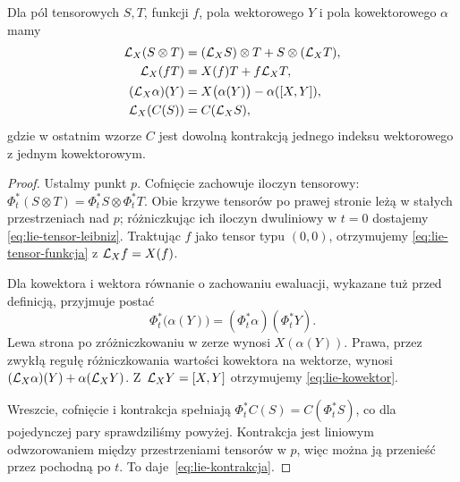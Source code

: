 \begin{twierdzenie}
\label{thm:lie-tensor-reguly}
Dla pól tensorowych $S,T$, funkcji $f$, pola wektorowego
$Y$ i pola kowektorowego $\alpha$ mamy
\begin{align}
 \mathcal L_X(S\otimes T)
 &= (\mathcal L_XS)\otimes T+S\otimes(\mathcal L_XT),
 \label{eq:lie-tensor-leibniz}\\
 \mathcal L_X(fT)&=X(f)T+f\mathcal L_XT,
 \label{eq:lie-tensor-funkcja}\\
 (\mathcal L_X\alpha)(Y)
 &=X\bigl(\alpha(Y)\bigr)-\alpha([X,Y]),
 \label{eq:lie-kowektor}\\
 \mathcal L_X(C(S))&=C(\mathcal L_XS),
 \label{eq:lie-kontrakcja}
\end{align}
gdzie w ostatnim wzorze $C$ jest dowolną kontrakcją
jednego indeksu wektorowego z jednym kowektorowym.
\end{twierdzenie}
\begin{proof}
Ustalmy punkt $p$. Cofnięcie zachowuje iloczyn tensorowy:
$\Phi_t^*(S\otimes T)=\Phi_t^*S\otimes\Phi_t^*T$.
Obie krzywe tensorów po prawej stronie leżą w stałych
przestrzeniach nad $p$; różniczkując ich iloczyn
dwuliniowy w $t=0$ dostajemy
\eqref{eq:lie-tensor-leibniz}. Traktując $f$ jako tensor
typu $(0,0)$, otrzymujemy
\eqref{eq:lie-tensor-funkcja} z $\mathcal L_Xf=X(f)$.

Dla kowektora i wektora równanie o zachowaniu ewaluacji,
wykazane tuż przed definicją, przyjmuje postać
\[
 \Phi_t^*\bigl(\alpha(Y)\bigr)
 =(\Phi_t^*\alpha)(\Phi_t^*Y).
\]
Lewa strona po zróżniczkowaniu w zerze wynosi
$X(\alpha(Y))$. Prawa, przez zwykłą regułę
różniczkowania wartości kowektora na wektorze,
wynosi $(\mathcal L_X\alpha)(Y)+\alpha(\mathcal L_XY)$.
Z~$\mathcal L_XY=[X,Y]$ otrzymujemy
\eqref{eq:lie-kowektor}.

Wreszcie, cofnięcie i kontrakcja spełniają
$\Phi_t^*C(S)=C(\Phi_t^*S)$, co dla pojedynczej
pary sprawdziliśmy powyżej. Kontrakcja jest liniowym
odwzorowaniem między przestrzeniami tensorów w $p$, więc
można ją przenieść przez pochodną po $t$.
To daje~\eqref{eq:lie-kontrakcja}.
\end{proof}

